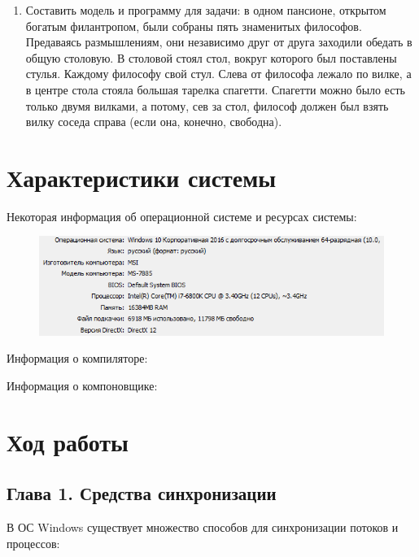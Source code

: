 \documentclass[14pt,a4paper,report]{report}
\begin{document}
\begin{enumerate}
	\item Составить модель и программу для задачи: в одном пансионе, открытом богатым филантропом, были собраны пять знаменитых философов. Предаваясь размышлениям, они независимо друг от друга заходили обедать в общую столовую. В столовой стоял стол, вокруг которого был поставлены стулья.
	Каждому философу свой стул. Слева от философа лежало по вилке, а в центре стола стояла большая тарелка спагетти. Спагетти можно было есть только двумя вилками, а потому, сев за стол, философ должен был взять вилку соседа справа (если она, конечно, свободна).
\end{enumerate}

\clearpage

\section{Характеристики системы}

Некоторая информация об операционной системе и ресурсах системы:

\begin{figure}[h!]
	\centering
	\includegraphics[scale = 1.05]{images/0.png}
	
	\caption{}
	\label{image:1}
\end{figure}

Информация о компиляторе:



Информация о компоновщике:



\section{Ход работы}

\subsection{Глава 1. Средства синхронизации}

В ОС Windows существует множество способов для синхронизации потоков и процессов:
\end{document}
